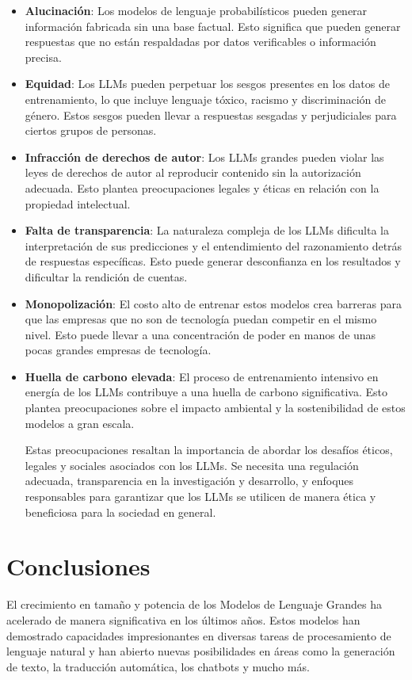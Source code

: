 \begin{itemize}
\item \textbf{Alucinación}: Los modelos de lenguaje probabilísticos pueden generar información fabricada sin una base factual. Esto significa que pueden generar respuestas que no están respaldadas por datos verificables o información precisa.

\item \textbf{Equidad}: Los LLMs pueden perpetuar los sesgos presentes en los datos de entrenamiento, lo que incluye lenguaje tóxico, racismo y discriminación de género. Estos sesgos pueden llevar a respuestas sesgadas y perjudiciales para ciertos grupos de personas.

\item \textbf{Infracción de derechos de autor}: Los LLMs grandes pueden violar las leyes de derechos de autor al reproducir contenido sin la autorización adecuada. Esto plantea preocupaciones legales y éticas en relación con la propiedad intelectual.

\item \textbf{Falta de transparencia}: La naturaleza compleja de los LLMs dificulta la interpretación de sus predicciones y el entendimiento del razonamiento detrás de respuestas específicas. Esto puede generar desconfianza en los resultados y dificultar la rendición de cuentas.

\item \textbf{Monopolización}: El costo alto de entrenar estos modelos crea barreras para que las empresas que no son de tecnología puedan competir en el mismo nivel. Esto puede llevar a una concentración de poder en manos de unas pocas grandes empresas de tecnología.

\item \textbf{Huella de carbono elevada}: El proceso de entrenamiento intensivo en energía de los LLMs contribuye a una huella de carbono significativa. Esto plantea preocupaciones sobre el impacto ambiental y la sostenibilidad de estos modelos a gran escala.

Estas preocupaciones resaltan la importancia de abordar los desafíos éticos, legales y sociales asociados con los LLMs. Se necesita una regulación adecuada, transparencia en la investigación y desarrollo, y enfoques responsables para garantizar que los LLMs se utilicen de manera ética y beneficiosa para la sociedad en general.
\end{itemize}

\section{Conclusiones}
El crecimiento en tamaño y potencia de los Modelos de Lenguaje Grandes ha acelerado de manera significativa en los últimos años. Estos modelos han demostrado capacidades impresionantes en diversas tareas de procesamiento de lenguaje natural y han abierto nuevas posibilidades en áreas como la generación de texto, la traducción automática, los chatbots y mucho más.

